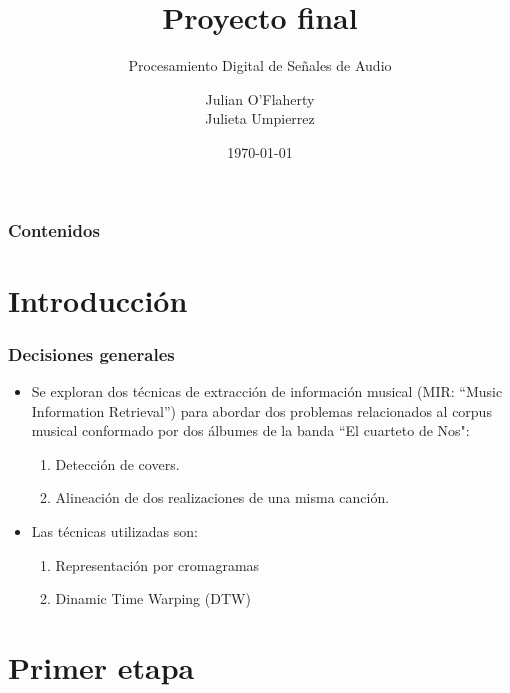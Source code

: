 \documentclass{beamer}
\title[Proyecto 1] %
{Proyecto final}
\subtitle{Procesamiento Digital de Señales de Audio}
\author[] %
{
Julian O'Flaherty \\
Julieta Umpierrez}
\institute[AudioDSP] %
{
  Instituto de Ingeniería Eléctrica\\
  FIng-UdelaR
}
\date[] %
{\today}
\begin{document}
\frame{\titlepage}


\begin{frame}
\frametitle{Contenidos}
\tableofcontents
\end{frame}





\section{Introducción}

\begin{frame}
\frametitle{Decisiones generales}
\begin{itemize}
    \item Se exploran dos técnicas de extracción de información musical (MIR: ``Music Information Retrieval'') para abordar dos problemas relacionados al corpus musical conformado por dos álbumes de la banda ``El cuarteto de Nos":
    \begin{enumerate}
        \item Detección de covers.
        \item Alineación de dos realizaciones de una misma canción.
    \end{enumerate}
    \item Las técnicas utilizadas son:
    \begin{enumerate}
        \item Representación por cromagramas
        \item Dinamic Time Warping (DTW)
    \end{enumerate}
\end{itemize}
\end{frame}



\section{Primer etapa}
\end{document}
